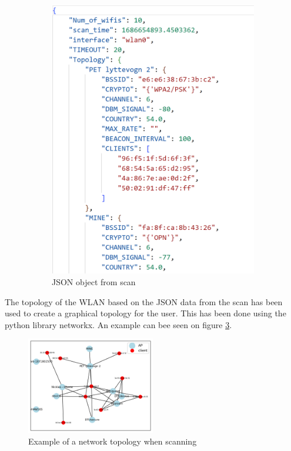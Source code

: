 \begin{figure}[!htbp]
\begin{subfigure}{0.49\textwidth}
         \includegraphics[width=\textwidth]{Latex-Files/Billeder/JSON_object.png}
         \caption{JSON object from scan}
         \label{json_scan}
     \end{subfigure}
     \caption{}
\end{figure}

The topology of the WLAN based on the JSON data from the scan has been used to create a graphical topology for the user. This has been done using the python library networkx. An example can bee seen on figure \ref{network_topology}.

\begin{figure}[!htbp]
    \centering
    \includegraphics[width=0.5\textwidth]{Latex-Files/Billeder/network_topology.png}
    \caption{Example of a network topology when scanning}
    \label{network_topology}
\end{figure}




